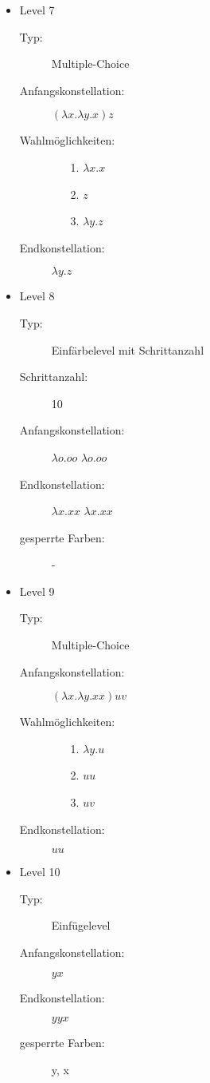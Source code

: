 \begin{itemize}
	\item{Level 7} 
		\begin{description}
			\item[Typ:] Multiple-Choice 
			\item[Anfangskonstellation:] \((\lambda x . \lambda y . x ) z\)    
			\item[Wahlmöglichkeiten:] \hfill
				\begin{itemize}
					\item[1.] \( \lambda x . x\) 
					\item[2.] \( z \) 
					\item[3.] \( \lambda y . z\)
				\end{itemize}
			\item[Endkonstellation:]\( \lambda y . z\)
		\end{description}

	\item{Level 8} 
		\begin{description}
			\item[Typ:] Einfärbelevel mit Schrittanzahl
			\item[Schrittanzahl:] 10
			\item[Anfangskonstellation:] \(\lambda o . o o \)  \(\lambda o . o o \) 
			\item[Endkonstellation:]  \(\lambda x . x x \)  \(\lambda x . x x \) 
			\item[gesperrte Farben:] -
		\end{description}

	\item{Level 9} 
		\begin{description}
			\item[Typ:] Multiple-Choice 
			\item[Anfangskonstellation:] \((\lambda x . \lambda y . x x ) u v\)    
			\item[Wahlmöglichkeiten:] \hfill
				\begin{itemize}
					\item[1.] \( \lambda y . u\) 
					\item[2.] \( u u \) 
					\item[3.] \( u v \)
				\end{itemize}
			\item[Endkonstellation:]\(u u\)
		\end{description}
	
	\item{Level 10} 
		\begin{description}
			\item[Typ:] Einfügelevel
			\item[Anfangskonstellation:] \(y x \)    
			\item[Endkonstellation:] \(y y x\)
			\item[gesperrte Farben:] y, x 
		\end{description}


\end{itemize}
